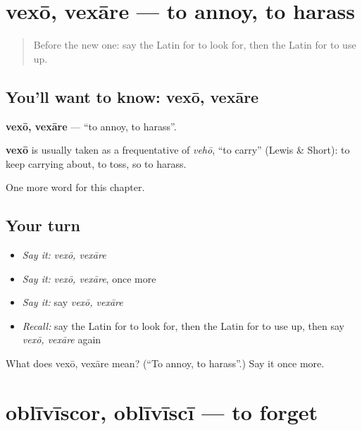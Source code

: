 \section[vexō, vexāre]{vexō, vexāre — to annoy, to harass}

\label{lesson:LA-C203-vexo}



\begin{quote}
Before the new one: say the Latin for to look for, then the Latin for to use up.
\end{quote}

\subsection*{You'll want to know: vexō, vexāre}
\textbf{vexō, vexāre} — \textquotedblleft{}to annoy, to harass\textquotedblright{}.

\begin{cousinweb}
\textbf{vexō} is usually taken as a frequentative of \emph{vehō}, \textquotedblleft{}to carry\textquotedblright{} (Lewis \& Short): to keep carrying about, to toss, so to harass.
\end{cousinweb}

\begin{grammarlens}[title={What you've built}]
One more word for this chapter.
\end{grammarlens}

\subsection*{Your turn}
\begin{itemize}
\raggedright
  \item \emph{Say it:} \emph{vexō, vexāre}
  \item \emph{Say it:} \emph{vexō, vexāre}, once more
  \item \emph{Say it:} say \emph{vexō, vexāre}
  \item \emph{Recall:} say the Latin for to look for, then the Latin for to use up, then say \emph{vexō, vexāre} again
\end{itemize}

\begin{tcolorbox}[breakable,colback=teal!4,colframe=teal!35!black,title={Before you move on}]
What does vexō, vexāre mean? (\textquotedblleft{}To annoy, to harass\textquotedblright{}.) Say it once more.
\end{tcolorbox}
\section[oblīvīscor, oblīvīscī]{oblīvīscor, oblīvīscī — to forget}

